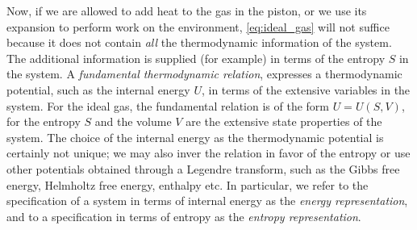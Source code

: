 Now, if we are allowed to add heat to the gas in the piston, or we use its expansion to perform work on the environment, \cref{eq:ideal_gas} will not suffice because it does not contain \emph{all} the thermodynamic information of the system. The additional information is supplied (for example) in terms of the entropy $S$ in the system. A \emph{fundamental thermodynamic relation}, expresses a thermodynamic potential, such as the internal energy $U$, in terms of the extensive variables in the system. For the ideal gas, the fundamental relation is of the form $U = U(S, V)$, for the entropy $S$ and the volume $V$ are the extensive state properties of the system. The choice of the internal energy as the thermodynamic potential is certainly not unique; we may also inver the relation in favor of the entropy or use other potentials obtained through a Legendre transform, such as the Gibbs free energy, Helmholtz free energy, enthalpy etc. In particular, we refer to the specification of a system in terms of internal energy as the \emph{energy representation}, and to a specification in terms of entropy as the \emph{entropy representation}. \cite{VanderSchaft2021a}

